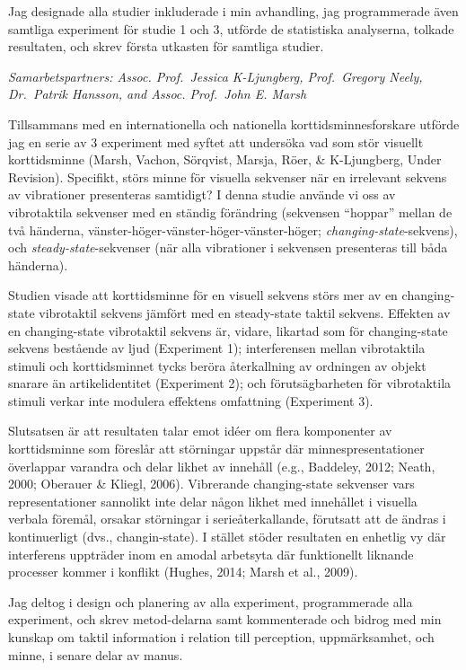 \documentclass[]{article}
\begin{document}
Jag designade alla studier inkluderade i min avhandling, jag
programmerade även samtliga experiment för studie 1 och 3, utförde de
statistiska analyserna, tolkade resultaten, och skrev första utkasten
för samtliga studier.

\emph{Samarbetspartners: Assoc. Prof.~Jessica K-Ljungberg, Prof.~Gregory
Neely, Dr.~Patrik Hansson, and Assoc. Prof.~John E. Marsh}

Tillsammans med en internationella och nationella korttidsminnesforskare
utförde jag en serie av 3 experiment med syftet att undersöka vad som
stör visuellt korttidsminne (Marsh, Vachon, Sörqvist, Marsja, Röer, \&
K-Ljungberg, Under Revision). Specifikt, störs minne för visuella
sekvenser när en irrelevant sekvens av vibrationer presenteras
samtidigt? I denna studie använde vi oss av vibrotaktila sekvenser med
en ständig förändring (sekvensen ``hoppar'' mellan de två händerna,
vänster-höger-vänster-höger-vänster-höger;
\emph{changing-state}-sekvens), och \emph{steady-state}-sekvenser (när
alla vibrationer i sekvensen presenteras till båda händerna).

Studien visade att korttidsminne för en visuell sekvens störs mer av en
changing-state vibrotaktil sekvens jämfört med en steady-state taktil
sekvens. Effekten av en changing-state vibrotaktil sekvens är, vidare,
likartad som för changing-state sekvens bestående av ljud (Experiment
1); interferensen mellan vibrotaktila stimuli och korttidsminnet tycks
beröra återkallning av ordningen av objekt snarare än artikelidentitet
(Experiment 2); och förutsägbarheten för vibrotaktila stimuli verkar
inte modulera effektens omfattning (Experiment 3).

Slutsatsen är att resultaten talar emot idéer om flera komponenter av
korttidsminne som föreslår att störningar uppstår där
minnespresentationer överlappar varandra och delar likhet av innehåll
(e.g., Baddeley, 2012; Neath, 2000; Oberauer \& Kliegl, 2006).
Vibrerande changing-state sekvenser vars representationer sannolikt inte
delar någon likhet med innehållet i visuella verbala föremål, orsakar
störningar i serieåterkallande, förutsatt att de ändras i kontinuerligt
(dvs., changin-state). I stället stöder resultaten en enhetlig vy där
interferens uppträder inom en amodal arbetsyta där funktionellt liknande
processer kommer i konflikt (Hughes, 2014; Marsh et al., 2009).

Jag deltog i design och planering av alla experiment, programmerade alla
experiment, och skrev metod-delarna samt kommenterade och bidrog med min
kunskap om taktil information i relation till perception, uppmärksamhet,
och minne, i senare delar av manus.
\end{document}
